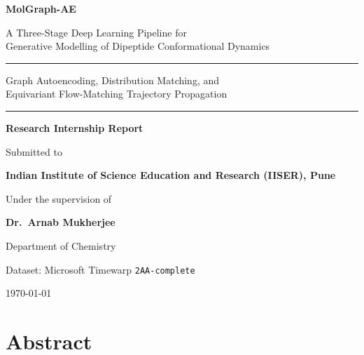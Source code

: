 \documentclass[11pt,a4paper]{article}
\begin{document}
\begin{titlepage}
\centering
\vspace*{1.4cm}

{\LARGE\bfseries MolGraph-AE\par}
\vspace{0.5cm}
{\large A Three-Stage Deep Learning Pipeline for\\[2pt]
Generative Modelling of Dipeptide Conformational Dynamics\par}

\vspace{1.4cm}
\rule{\textwidth}{0.5pt}
\vspace{0.4cm}

{\large
Graph Autoencoding, Distribution Matching, and\\
Equivariant Flow-Matching Trajectory Propagation\par}

\vspace{0.4cm}
\rule{\textwidth}{0.5pt}

\vfill

{\large\bfseries Research Internship Report\par}
\vspace{0.8cm}

{\large Submitted to\par}
\vspace{0.3cm}
{\large\bfseries Indian Institute of Science Education and Research (IISER), Pune\par}

\vspace{0.9cm}
{\large Under the supervision of\par}
\vspace{0.3cm}
{\large\bfseries Dr.\ Arnab Mukherjee\par}
{\normalsize Department of Chemistry\par}

\vfill
{\normalsize Dataset: Microsoft Timewarp \texttt{2AA-complete}\par}
{\normalsize \today\par}
\end{titlepage}

\tableofcontents
\newpage

\section{Abstract}
\end{document}
